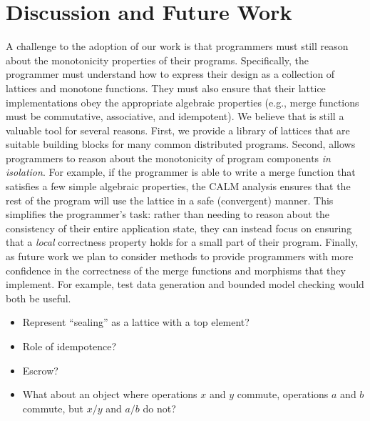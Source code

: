 \section{Discussion and Future Work}
\label{sec:discussion}

A challenge to the adoption of our work is that programmers must still reason
about the monotonicity properties of their programs. Specifically, the
programmer must understand how to express their design as a collection of
lattices and monotone functions. They must also ensure that their lattice
implementations obey the appropriate algebraic properties (e.g., merge functions
must be commutative, associative, and idempotent). We believe that \lang is
still a valuable tool for several reasons. First, we provide a library of
lattices that are suitable building blocks for many common distributed
programs. Second, \lang allows programmers to reason about the monotonicity of
program components \emph{in isolation}. For example, if the programmer is able
to write a merge function that satisfies a few simple algebraic properties, the
CALM analysis ensures that the rest of the program will use the lattice in a
safe (convergent) manner. This simplifies the programmer's task: rather than
needing to reason about the consistency of their entire application state, they
can instead focus on ensuring that a \emph{local} correctness property holds for
a small part of their program. Finally, as future work we plan to consider
methods to provide programmers with more confidence in the correctness of the
merge functions and morphisms that they implement. For example, test data
generation and bounded model checking would both be useful.

\begin{itemize}
\item
  Represent ``sealing'' as a lattice with a top element?
\item 
  Role of idempotence?
\item
  Escrow?
\item 
  What about an object where operations $x$ and $y$ commute, operations $a$ and
  $b$ commute, but $x/y$ and $a/b$ do not?
\end{itemize}
